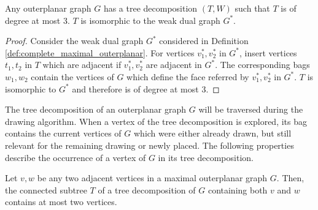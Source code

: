 \begin{lemma}\label{l:outerplanar_tree_decomposition}
	Any outerplanar graph $G$ has a tree decomposition $(T,W)$ such that $T$ is of degree at most 3. $T$ is isomorphic to the weak dual graph $G^*$.
\end{lemma}
\begin{proof}
	Consider the weak dual graph $G^*$ considered in Definition \ref{def:complete_maximal_outerplanar}. For vertices $v_1^*,v_2^*$ in $G^*$, insert vertices $t_1,t_2$ in $T$ which are adjacent if $v_1^*,v_2^*$ are adjacent in $G^*$. The corresponding bags $w_1, w_2$ contain the vertices of $G$ which define the face referred by $v_1^*,v_2^*$ in $G^*$. $T$ is isomorphic to $G^*$ and therefore is of degree at most 3.
\end{proof}
The tree decomposition of an outerplanar graph $G$ will be traversed during the drawing algorithm. When a vertex of the tree decomposition is explored, its bag contains the current vertices of $G$ which were either already drawn, but still relevant for the remaining drawing or newly placed. The following properties describe the occurrence of a vertex of $G$ in its tree decomposition.
\begin{lemma}\label{l:outerplanar_two_vertices_subtree_TD_2}
	Let $v,w$ be any two adjacent vertices in a maximal outerplanar graph $G$. Then, the connected subtree $T$ of a tree decomposition of $G$ containing both $v$ and $w$ contains at most two vertices.
\end{lemma}
